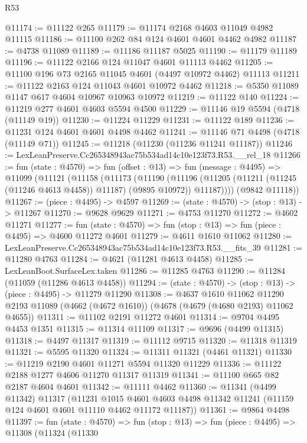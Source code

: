 \begin{lexlean}{R53}
\begin{coremodule}
@11174 := @11122 @265
@11179 := @11174 @2168 @4603 @11049 @4982 @11115
@11186 := @11100 @262 @84 @124 @4601 @4601 @4462 @4982
@11187 := @4738 @11089
@11189 := @11186 @11187 @5025
@11190 := @11179 @11189
@11196 := @11122 @2166 @124 @11047 @4601 @11113 @4462
@11205 := @11100 @196 @73 @2165 @11045 @4601 (@4497 @10972 @4462) @11113
@11211 := @11122 @2163 @124 @11043 @4601 @10972 @4462
@11218 := @5350 @11089 @1147 @617 @4604 @10967 @10963 @10972
@11219 := @11122 @140
@11224 := @11219 @277 @4601 @4603 @5594 @4500
@11229 := @11146 @19 @5594 (@4718 (@11149 @19))
@11230 := @11224 @11229
@11231 := @11122 @189
@11236 := @11231 @124 @4601 @4601 @4498 @4462
@11241 := @11146 @71 @4498 (@4718 (@11149 @71))
@11245 := @11218 (@11230 (@11236 @11241 @11187))
@11246 := LexLeanPreserve.Cc265348943ac75b534ad14c10e123f73.R53.__rel_18
@11266 := fun (state : @4570) =>
  fun (offset : @13) =>
  fun (message : @4495) =>
  @11099
    (@11121
      (@11158
        (@11173
          (@11190
            (@11196 (@11205 (@11211 (@11245 (@11246 @4613 @4458)) @11187) (@9895 @10972)) @11187))))
      (@9842 @11118))
@11267 := (piece : @4495) -> @4597
@11269 := (state : @4570) -> (stop : @13) -> @11267
@11270 := @9628 @9629
@11271 := @4753 @11270
@11272 := @4602 @11271
@11277 := fun (state : @4570) => fun (stop : @13) => fun (piece : @4495) => @4600 @11272 @4601
@11279 := @4611 @1610 @11062
@11280 := LexLeanPreserve.Cc265348943ac75b534ad14c10e123f73.R53.__fits_39
@11281 := @11280 @4763
@11284 := @4621 (@11281 @4613 @4458)
@11285 := LexLeanBoot.SurfaceLex.taken
@11286 := @11285 @4763
@11290 := @11284 (@11059 (@11286 @4613 @4458))
@11294 := (state : @4570) -> (stop : @13) -> (piece : @4495) -> @11279 @11290
@11308 := @4637
    @1610
    @11062
    @11290
    @2193
    @11089
    (@4662 (@4672 @1610))
    (@4678 (@4679 (@4680 @2193) @11062 @4655))
@11311 := @11102 @2191 @11272 @4601
@11314 := @9704 @4495 @4453 @1351
@11315 := @11314 @11109
@11317 := @9696 (@4499 @11315)
@11318 := @4497 @11317
@11319 := @11112 @9715
@11320 := @11318 @11319
@11321 := @5595 @11320
@11324 := @11311 @11321 (@4461 @11321)
@11330 := @11219 @2190 @4601 @11271 @5594 @11320 @11229
@11336 := @11122 @2188 @1277 @4606 @11270 @11317 @11319
@11341 := @11100 @665 @82 @2187 @4604 @4601
@11342 := @11111 @4462
@11360 := @11341
    (@4499 @11342)
    @11317
    (@11231
      @1015
      @4601
      @4603
      @4498
      @11342
      @11241
      (@11159 @124 @4601 @4601 @11110 @4462 @11172 @11187))
@11361 := @9864 @4498
@11397 := fun (state : @4570) =>
  fun (stop : @13) =>
  fun (piece : @4495) =>
  @11308
    (@11324
      (@11330

\end{coremodule}
\end{lexlean}
